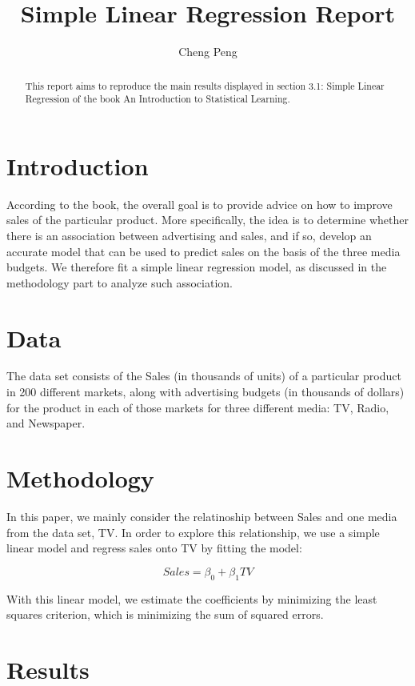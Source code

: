 \documentclass[a4paper]{article}
\title{Simple Linear Regression Report}
\author{Cheng Peng}
\begin{document}

\maketitle

\begin{abstract}
This report aims to reproduce the main results displayed in section 3.1: Simple Linear Regression of the book An Introduction to Statistical Learning.
\end{abstract}

\section{Introduction}
According to the book, the overall goal is to provide advice on how to improve sales of the particular product. More specifically, the idea is to determine whether there is an association between advertising and sales, and if so, develop an accurate model that can be used to predict sales on the basis of the three media budgets. We therefore fit a simple linear regression model, as discussed in the methodology part to analyze such association.

\section{Data}
The data set consists of the Sales (in thousands of units) of a particular product in 200 different markets, along with advertising budgets (in thousands of dollars) for the product in each of those markets for three different media: TV, Radio, and Newspaper.


\section{Methodology}
In this paper, we mainly consider the relatinoship between Sales and one media from the data set, TV. In order to explore this relationship, we use a simple linear model and regress sales onto TV by fitting the model:

\begin{equation}
Sales = \beta_0 + \beta_1 TV
\end{equation}

With this linear model, we estimate the coefficients by minimizing the least squares criterion, which is minimizing the sum of squared errors.

\section{Results}
\end{document}
